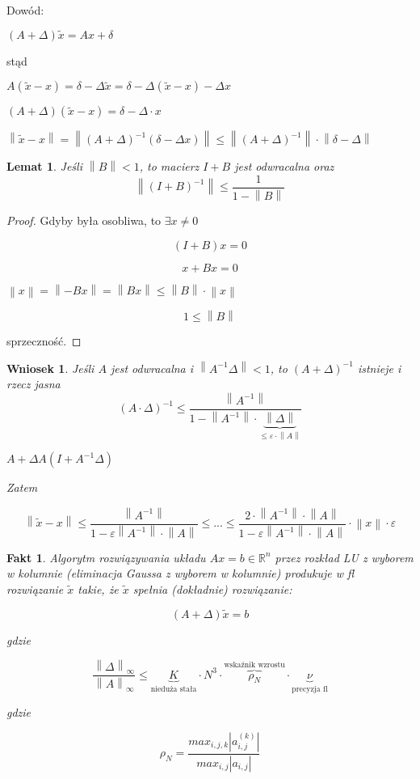 \documentclass[hidelinks,a4paper,fleqn]{article}
\newcommand{\RR}{\mathbb{R}}
\newcommand{\norm}[1]{\left\lVert#1\right\rVert}
\newtheorem{wniosek}{Wniosek}
\newtheorem{fakt}{Fakt}
\newtheorem{lemat}{Lemat}
\begin{document}
Dowód:

$(A + \Delta)\tilde{x} = Ax + \delta$

stąd

$A(\tilde{x} - x) = \delta - \Delta \tilde{x} = \delta - \Delta(\tilde{x} - x) - \Delta x$

$(A+\Delta)(\tilde{x} - x) = \delta - \Delta \cdot x$

$\norm{\tilde{x} - x} = \norm{(A+\Delta)^{-1}(\delta - \Delta x)} \leq \norm{(A + \Delta)^{-1}} \cdot \norm{\delta - \Delta}$

\begin{lemat} Jeśli $\norm{B} < 1$, to macierz $I + B$ jest odwracalna oraz
	\[
		\norm{(I + B)^{-1}} \leq \frac{1}{1 - \norm{B}}
	\]
\end{lemat}

\begin{proof}
	Gdyby była osobliwa, to $\exists x \neq 0$
	    
	\[
		(I + B)x = 0
	\]
	    
	\[
		x + Bx = 0
	\]
	    
	$\norm{x} = \norm{-Bx} = \norm{Bx} \leq \norm{B} \cdot \norm{x}$
	    
	\[
		1 \leq \norm{B}
	\]
	    
	sprzeczność.
\end{proof}

\begin{wniosek} Jeśli $A$ jest odwracalna i $\norm{A ^ {-1} \Delta} < 1$, to $(A + \Delta)^{-1}$ istnieje i rzecz jasna
	\[
		(A \cdot \Delta)^{-1} \leq \frac{\norm{A^{-1}}}{1 - \norm{A^{-1}} \cdot \underbrace{\norm{\Delta}}_{\leq \varepsilon \cdot \norm{A}}}
	\]
	
	$A + \Delta  A(I + A^{-1} \Delta)$
	
	Zatem
	
	\[
		\norm{\tilde{x} - x} \leq \frac{\norm{A^{-1}}}{1 - \varepsilon \norm{A^{-1}} \cdot \norm{A}} \leq ... \leq \frac{2 \cdot \norm{A^{-1}} \cdot \norm{A}}{1 - \varepsilon \norm{A^{-1}} \cdot \norm{A}} \cdot \norm{x} \cdot \varepsilon
	\]
\end{wniosek}

\begin{fakt} Algorytm rozwiązywania układu $Ax = b \in \RR^n$ przez rozkład LU z wyborem w kolumnie (eliminacja Gaussa z wyborem w kolumnie) produkuje w fl rozwiązanie $\tilde{x}$ takie, że $\tilde{x}$ spełnia (dokładnie) rozwiązanie:
	
	\[
		(A + \Delta)\tilde{x} = b
	\]
	
	gdzie
	
	\[
		\frac{\norm{\Delta}_\infty}{\norm{A}_\infty} \leq \underbrace{K}_{\textrm{nieduża stała}} \cdot N^3 \cdot \overbrace{\rho_N}^{\textrm{wskaźnik wzrostu}} \cdot \underbrace{\nu}_{\textrm{precyzja fl}}
	\]
	
	gdzie
	
	\[
		\rho_N = \frac{max_{i, j, k} |a_{i, j}^{(k)}|}{max_{i, j}|a_{i,j}|}
	\]
\end{fakt}
\end{document}
